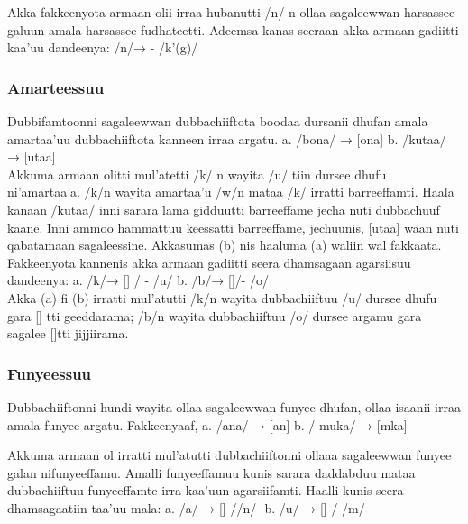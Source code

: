 \documentclass[11pt,b5paper]{book}
\begin{document}
\begin{itemize}
Akka fakkeenyota armaan olii irraa hubanutti /n/ n ollaa  sagaleewwan harsassee galuun amala harsassee  fudhateetti. Adeemsa kanas seeraan akka armaan gadiitti  kaa’uu dandeenya:  \newline
/n/→ \textipa{[N]/}- /k'(g)/  

\subsubsection{Amarteessuu}

Dubbifamtoonni sagaleewwan dubbachiiftota boodaa dursanii  dhufan amala amartaa’uu dubbachiiftota kanneen irraa argatu.  \newline
a. /bona/ → [ona]  \newline
b. /kutaa/ → [utaa] \\
Akkuma armaan olitti mul'atetti /k/ n wayita /u/ tiin dursee  dhufu ni’amartaa'a. /k/n wayita amartaa’u /w/n mataa /k/ irratti barreeffamti. Haala kanaan /kutaa/ inni sarara lama  gidduutti barreeffame jecha nuti dubbachuuf kaane. Inni  ammoo hammattuu keessatti barreeffame, jechuunis, [utaa]  waan nuti qabatamaan sagaleessine. Akkasumas (b) nis  haaluma (a) waliin wal fakkaata. Fakkeenyota kannenis akka  armaan gadiitti seera dhamsagaan agarsiisuu dandeenya: \newline
a. /k/→ [] / - /u/  \newline
b. /b/→ []/- /o/ \\
 
Akka (a) fi (b) irratti mul’atutti /k/n wayita dubbachiiftuu /u/  dursee dhufu gara [] tti geeddarama; /b/n wayita  dubbachiiftuu /o/ dursee argamu gara sagalee []tti  jijjiirama.  

\subsubsection{Funyeessuu}

Dubbachiiftonni hundi wayita ollaa sagaleewwan funyee dhufan, ollaa isaanii irraa amala funyee argatu. Fakkeenyaaf, \newline
a. /ana/ → [an]  \newline
b. / muka/ → [mka]  

Akkuma armaan ol irratti mul'atutti dubbachiiftonni ollaaa  sagaleewwan funyee galan nifunyeeffamu. Amalli  funyeeffamuu kunis sarara daddabduu mataa dubbachiiftuu  funyeeffamte irra kaa'uun agarsiifamti. Haalli kunis seera  dhamsagaatiin taa'uu mala:  \newline
a. /a/ → [] //n/-  \newline
b. /u/ → [] / /m/- 


\end{itemize}
\end{document}
